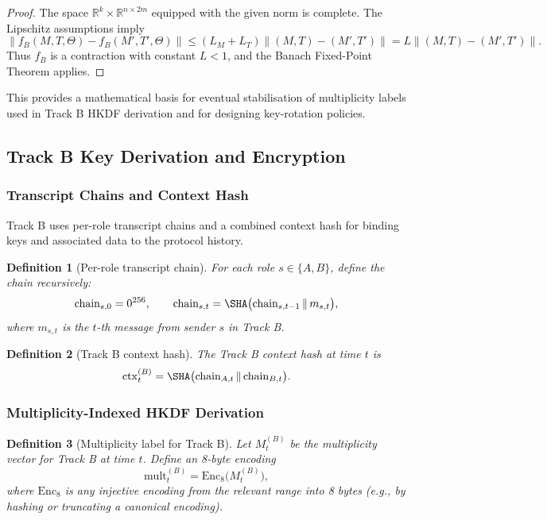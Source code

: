 \documentclass[11pt]{article}
\newtheorem{definition}{Definition}[section]
\newcommand{\R}{\mathbb{R}}
\newcommand{\norm}[1]{\left\lVert #1 \right\rVert}
\begin{document}
\begin{proof}
The space \(\R^k \times \R^{n\times 2m}\) equipped with the given norm is complete.
The Lipschitz assumptions imply
\[
  \norm{f_B(M,T,\Theta) - f_B(M',T',\Theta)} \le (L_M + L_T) \norm{(M,T)-(M',T')} = L \norm{(M,T)-(M',T')}.
\]
Thus \(f_B\) is a contraction with constant \(L < 1\), and the Banach Fixed-Point Theorem applies.
\end{proof}

This provides a mathematical basis for eventual stabilisation of multiplicity labels used in Track B HKDF derivation and for designing key-rotation policies.

\subsection{Track B Key Derivation and Encryption}

\subsubsection{Transcript Chains and Context Hash}

Track B uses per-role transcript chains and a combined context hash for binding keys and associated data to the protocol history.

\begin{definition}[Per-role transcript chain]
For each role \(s \in \{A,B\}\), define the chain recursively:
\[
  \mathrm{chain}_{s,0} = 0^{256}, \qquad
  \mathrm{chain}_{s,t} = \SHA\bigl(\mathrm{chain}_{s,t-1} \, \| \, m_{s,t}\bigr),
\]
where \(m_{s,t}\) is the \(t\)-th message from sender \(s\) in Track B.
\end{definition}

\begin{definition}[Track B context hash]
The Track B context hash at time \(t\) is
\[
  \mathrm{ctx}_t^{(B)} = \SHA\bigl(\mathrm{chain}_{A,t} \, \| \, \mathrm{chain}_{B,t}\bigr).
\]
\end{definition}

\subsubsection{Multiplicity-Indexed HKDF Derivation}

\begin{definition}[Multiplicity label for Track B]
Let \(M_t^{(B)}\) be the multiplicity vector for Track B at time \(t\).
Define an 8-byte encoding
\[
  \mathrm{mult}_t^{(B)} = \mathrm{Enc}_8\bigl(M_t^{(B)}\bigr),
\]
where \(\mathrm{Enc}_8\) is any injective encoding from the relevant range into 8 bytes (e.g., by hashing or truncating a canonical encoding).
\end{definition}
\end{document}
